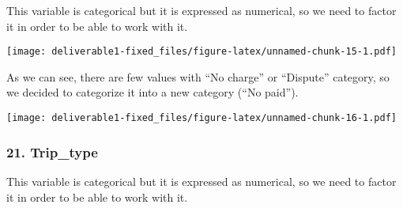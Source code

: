 \documentclass[
  18pt,
  a4paper]{article}
\newenvironment{Shaded}{\begin{snugshade}}{\end{snugshade}}
\newcommand{\CommentTok}[1]{\textcolor[rgb]{0.56,0.35,0.01}{\textit{#1}}}
\newcommand{\DataTypeTok}[1]{\textcolor[rgb]{0.13,0.29,0.53}{#1}}
\newcommand{\KeywordTok}[1]{\textcolor[rgb]{0.13,0.29,0.53}{\textbf{#1}}}
\newcommand{\NormalTok}[1]{#1}
\newcommand{\OperatorTok}[1]{\textcolor[rgb]{0.81,0.36,0.00}{\textbf{#1}}}
\newcommand{\StringTok}[1]{\textcolor[rgb]{0.31,0.60,0.02}{#1}}
\begin{document}
This variable is categorical but it is expressed as numerical, so we
need to factor it in order to be able to work with it.

\begin{Shaded}
\end{Shaded}

\texttt{[image: deliverable1-fixed\_files/figure-latex/unnamed-chunk-15-1.pdf]}

As we can see, there are few values with ``No charge'' or ``Dispute''
category, so we decided to categorize it into a new category (``No
paid'').

\begin{Shaded}
\end{Shaded}

\texttt{[image: deliverable1-fixed\_files/figure-latex/unnamed-chunk-16-1.pdf]}

\hypertarget{trip_type}{%
\subsubsection{21. Trip\_type}\label{trip_type}}

This variable is categorical but it is expressed as numerical, so we
need to factor it in order to be able to work with it.
\end{document}

